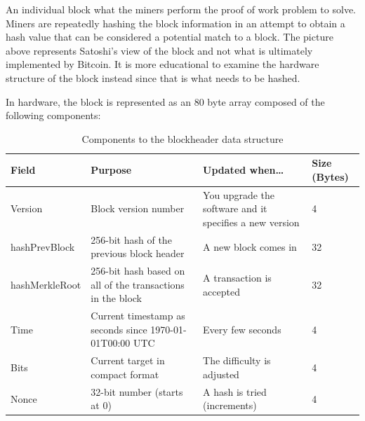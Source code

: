 \documentclass[pdftex,11pt]{article}
\begin{document}
An individual block what the miners perform the proof of work problem to solve. Miners are repeatedly hashing the block information in an attempt to obtain a hash value that can be considered a potential match to a block. The picture above represents Satoshi's view of the block and not what is ultimately implemented by Bitcoin. It is more educational to examine the hardware structure of the block instead since that is what needs to be hashed.

In hardware, the block is represented as an 80 byte array composed of the following components:

\begin{table}[H]
	\centering
 	\begin{tabular}{|p{2.25cm}|p{5cm}|p{5cm}|p{1cm}|}
		\hline
		\textbf{Field} & \textbf{Purpose} & \textbf{Updated when\dots}  & \textbf{Size (Bytes)}\\
		\hline
 		Version & Block version number & You upgrade the software and it specifies a new version & 4\\  \hline  
		hashPrevBlock & 256-bit hash of the previous block header &  A new block comes in & 32  \\  \hline 
		hashMerkleRoot & 256-bit hash based on all of the transactions in the block & A transaction is accepted & 32 \\  \hline 
		Time   & Current timestamp as seconds since 1970-01-01T00:00 UTC & Every few seconds & 4 \\  \hline 
		Bits & Current target in compact format & The difficulty is adjusted & 4  \\  \hline 
		Nonce &32-bit number (starts at 0) &A hash is tried (increments) & 4  \\  \hline 
	\end{tabular}
	\caption{Components to the blockheader data structure}	
\label{tab:blockheader}
\end{table}
\end{document}
